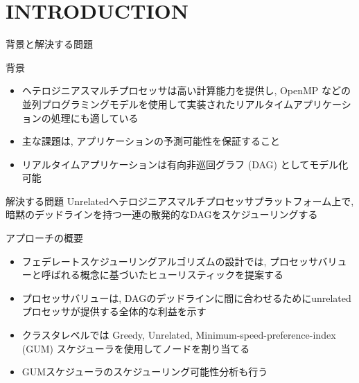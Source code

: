 
\section{INTRODUCTION}
\label{sec: introduction}

\begin{frame}{背景と解決する問題}
    \begin{block}{背景}
        \setlength{\linewidth}{0.98\columnwidth}
        \begin{itemize}
            \item ヘテロジニアスマルチプロセッサは高い計算能力を提供し, OpenMP などの並列プログラミングモデルを使用して実装されたリアルタイムアプリケーションの処理にも適している
            \item 主な課題は, アプリケーションの予測可能性を保証すること
            \item リアルタイムアプリケーションは有向非巡回グラフ (DAG) としてモデル化可能
        \end{itemize}
    \end{block}
    \begin{block}{解決する問題}
        Unrelatedヘテロジニアスマルチプロセッサプラットフォーム上で, 暗黙のデッドラインを持つ一連の散発的なDAGをスケジューリングする
    \end{block}
\end{frame}

\begin{frame}{アプローチの概要}
    \begin{itemize}
        \item フェデレートスケジューリングアルゴリズムの設計では, プロセッサバリューと呼ばれる概念に基づいたヒューリスティックを提案する
        \item プロセッサバリューは, DAGのデッドラインに間に合わせるためにunrelatedプロセッサが提供する全体的な利益を示す
        \item クラスタレベルでは Greedy, Unrelated, Minimum-speed-preference-index (GUM) スケジューラを使用してノードを割り当てる
        \item GUMスケジューラのスケジューリング可能性分析も行う
    \end{itemize}
\end{frame}
